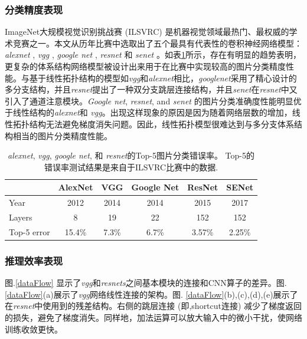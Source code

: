 \subsubsection{分类精度表现}
ImageNet大规模视觉识别挑战赛 (ILSVRC) 是机器视觉领域最热门、最权威的学术竞赛之一\cite{ILSVRC}。本文从历年比赛中选取出了五个最具有代表性的卷积神经网络模型： \emph{alexnet} \cite{b18}, \emph{vgg} \cite{2014Very}, \emph{google net} \cite{2014Going}, \emph{resnet} \cite{2016Deep} 和 \emph{senet} \cite{2017Squeeze}。如表\ref{fivemodels}所示，存在有明显的趋势表明，更复杂的体系结构网络模型被设计出来用于在比赛中实现较高的图片分类精度性能。与基于线性拓扑结构的模型如\emph{vgg}和\emph{alexnet}相比，\emph{googlenet}采用了精心设计的多分支结构，并且\emph{resnet}提出了一种双分支跳层连接结构，并且\emph{senet}在\emph{resnet}中又引入了通道注意模块。\emph{Google net}, \emph{resnet}, and \emph{senet} 的图片分类准确度性能明显优于线性结构的\emph{alexnet}和 \emph{vgg}。出现这样现象的原因是因为随着网络层数的增加，线性拓扑结构无法避免梯度消失问题。因此，线性拓扑模型很难达到与多分支体系结构相当的图片分类精度性能。
\begin{table}[h]
	\caption{ \emph{alexnet}, \emph{vgg}, \emph{google net}, 和 \emph{resnet}的Top-5图片分类错误率。 Top-5的错误率测试结果是来自于ILSVRC比赛中的数据.}
	\centering
	\label{fivemodels}
	\begin{tabular}{lccccc}
		\hline
		& \textbf{AlexNet} & \textbf{VGG}   & \textbf{Google Net} & \textbf{ResNet}  & \textbf{SENet} \\ \hline
		Year        & 2012    & 2014  & 2014      & 2015    & 2017 \\ \hline
		Layers      & 8       & 19    & 22        & 152     & 152  \\ \hline
		Top-5 error & 15.4\%  & 7.3\% & 6.7\%     & 3.57\%  & 2.25\% \\ \hline
	\end{tabular}
\end{table}

\subsubsection{推理效率表现}
图.\ref{dataFlow} 显示了\emph{vgg}和\emph{resnets}之间基本模块的连接和CNN算子的差异。图.\ref{dataFlow}(a)展示了\emph{vgg}网络线性连接的架构。图. \ref{dataFlow}(b),(c),(d),(e)展示了在\emph{resnet}中使用到的残差结构。右侧的跳层连接 (即,shortcut连接) 减少了梯度返回的损失，避免了梯度消失。同样地，加法运算可以放大输入中的微小干扰，使网络训练收敛更快。


